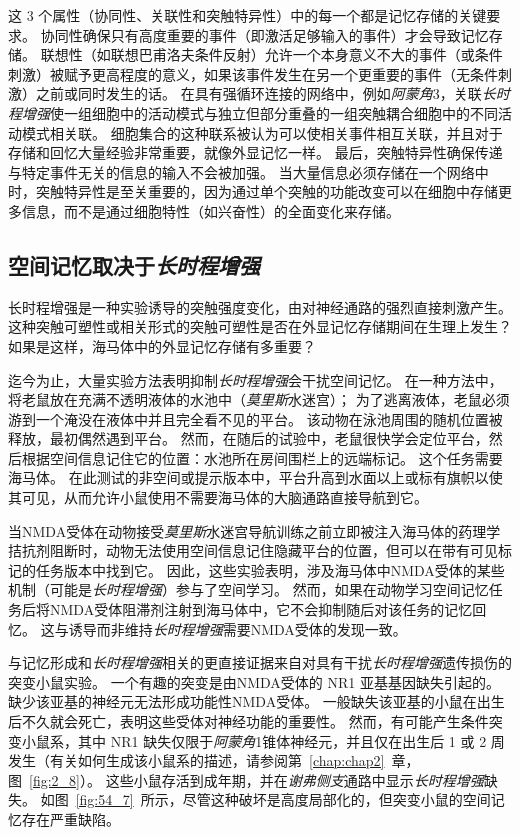 这 3 个属性（协同性、关联性和突触特异性）中的每一个都是记忆存储的关键要求。
协同性确保只有高度重要的事件（即激活足够输入的事件）才会导致记忆存储。
联想性（如联想巴甫洛夫条件反射）允许一个本身意义不大的事件（或条件刺激）被赋予更高程度的意义，如果该事件发生在另一个更重要的事件（无条件刺激）之前或同时发生的话。
在具有强循环连接的网络中，例如\textit{阿蒙角}3，关联\textit{长时程增强}使一组细胞中的活动模式与独立但部分重叠的一组突触耦合细胞中的不同活动模式相关联。
细胞集合的这种联系被认为可以使相关事件相互关联，并且对于存储和回忆大量经验非常重要，就像外显记忆一样。
最后，突触特异性确保传递与特定事件无关的信息的输入不会被加强。
当大量信息必须存储在一个网络中时，突触特异性是至关重要的，因为通过单个突触的功能改变可以在细胞中存储更多信息，而不是通过细胞特性（如兴奋性）的全面变化来存储。



\subsection{空间记忆取决于\textit{长时程增强}}

长时程增强是一种实验诱导的突触强度变化，由对神经通路的强烈直接刺激产生。
这种突触可塑性或相关形式的突触可塑性是否在外显记忆存储期间在生理上发生？
如果是这样，海马体中的外显记忆存储有多重要？


迄今为止，大量实验方法表明抑制\textit{长时程增强}会干扰空间记忆。
在一种方法中，将老鼠放在充满不透明液体的水池中（\textit{莫里斯}水迷宫）；
为了逃离液体，老鼠必须游到一个淹没在液体中并且完全看不见的平台。
该动物在泳池周围的随机位置被释放，最初偶然遇到平台。
然而，在随后的试验中，老鼠很快学会定位平台，然后根据空间信息记住它的位置：水池所在房间围栏上的远端标记。
这个任务需要海马体。
在此测试的非空间或提示版本中，平台升高到水面以上或标有旗帜以使其可见，从而允许小鼠使用不需要海马体的大脑通路直接导航到它。


当NMDA受体在动物接受\textit{莫里斯}水迷宫导航训练之前立即被注入海马体的药理学拮抗剂阻断时，动物无法使用空间信息记住隐藏平台的位置，但可以在带有可见标记的任务版本中找到它。
因此，这些实验表明，涉及海马体中NMDA受体的某些机制（可能是\textit{长时程增强}）参与了空间学习。
然而，如果在动物学习空间记忆任务后将NMDA受体阻滞剂注射到海马体中，它不会抑制随后对该任务的记忆回忆。
这与诱导而非维持\textit{长时程增强}需要NMDA受体的发现一致。


与记忆形成和\textit{长时程增强}相关的更直接证据来自对具有干扰\textit{长时程增强}遗传损伤的突变小鼠实验。
一个有趣的突变是由NMDA受体的 NR1 亚基基因缺失引起的。
缺少该亚基的神经元无法形成功能性NMDA受体。
一般缺失该亚基的小鼠在出生后不久就会死亡，表明这些受体对神经功能的重要性。
然而，有可能产生条件突变小鼠系，其中 NR1 缺失仅限于\textit{阿蒙角}1锥体神经元，并且仅在出生后 1 或 2 周发生（有关如何生成该小鼠系的描述，请参阅第~\ref{chap:chap2}~章，图~\ref{fig:2_8}）。
这些小鼠存活到成年期，并在\textit{谢弗侧支}通路中显示\textit{长时程增强}缺失。
如图~\ref{fig:54_7}~所示，尽管这种破坏是高度局部化的，但突变小鼠的空间记忆存在严重缺陷。


